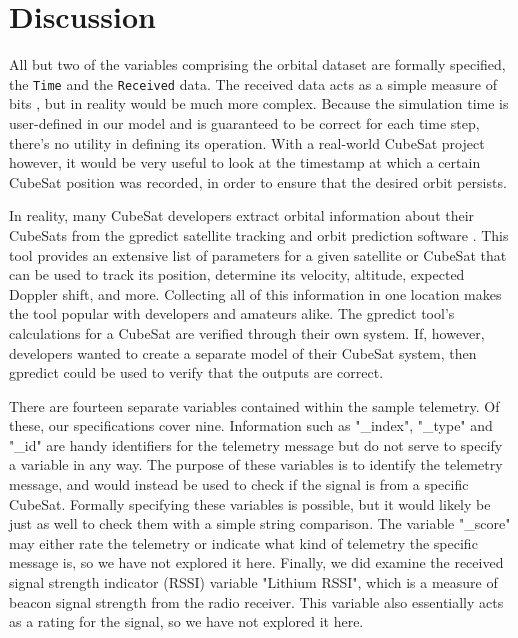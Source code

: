 \documentclass[conf]{new-aiaa}
\begin{document}
\section{Discussion}  \label{Discussion}

All but two of the variables comprising the orbital dataset are formally specified, the \texttt{Time} and the \texttt{Received} data. The received data acts as a simple measure of bits%
, but in reality would be much more complex. Because the simulation time is user-defined in our model and is guaranteed to be correct for each time step, there's no utility in defining its operation. With a real-world CubeSat project however, it would be very useful to look at the timestamp at which a certain CubeSat position was recorded, in order to ensure that the desired orbit persists.

In reality, many CubeSat developers extract orbital information about their CubeSats from the gpredict satellite tracking and orbit prediction software \cite{csete2018}. This tool provides an extensive list of parameters for a given satellite or CubeSat that can be used to track its position, determine its velocity, altitude, expected Doppler shift, and more. Collecting all of this information in one location makes the tool popular with developers and amateurs alike. The gpredict tool's calculations for a CubeSat are verified through their own system. If, however, developers wanted to create a separate model of their CubeSat system, then gpredict could be used to verify that the outputs are correct.

There are fourteen separate variables contained within the sample telemetry. Of these, our specifications cover nine. Information such as "\_index", "\_type" and "\_id" are handy identifiers for the telemetry message but do not serve to specify a variable in any way. The purpose of these variables is to identify the telemetry message, and would instead be used to check if the signal is from a specific CubeSat. Formally specifying these variables is possible, but it would likely be just as well to check them with a simple string comparison. The variable "\_score" may either rate the telemetry or indicate what kind of telemetry the specific message is, so we have not explored it here. Finally, we did examine the received signal strength indicator (RSSI) variable "Lithium RSSI", which is a measure of beacon signal strength from the radio receiver. This variable also essentially acts as a rating for the signal, so we have not explored it here.
\end{document}
